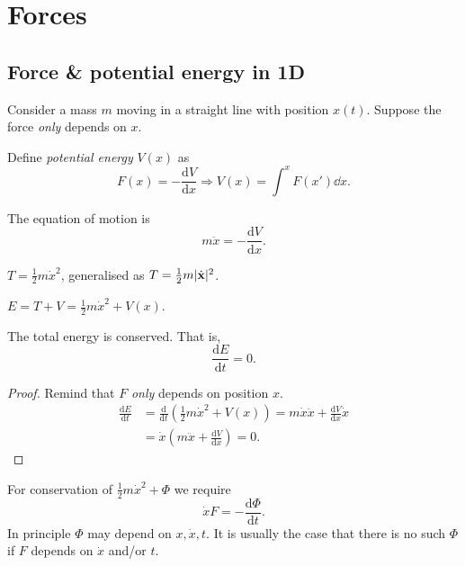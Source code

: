 \section{Forces}

\subsection{Force \& potential energy in 1D}

Consider a mass $m$ moving in a straight line with position $x(t)$. Suppose the force \textit{only} depends on $x$.
\begin{definition}
    Define \textit{potential energy} $ V(x) $ as 
    \[
        F(x) = -\frac{\mathrm{d}V}{\mathrm{d}x} \Longrightarrow V(x) = \int^{x}F(x')\dd x.
    \]
\end{definition}

The equation of motion is
\[
    m \ddot{x}=-\frac{\mathrm{d}V}{\mathrm{d}x} .
\]

\begin{definition}
    $T=\frac{1}{2}m \dot{x}^2$, generalised as $ T=\frac{1}{2}m|\dot{{\bf x}}|^2 $. 
\end{definition}
\begin{definition}
    $ E=T+V = \frac{1}{2}m \dot{x}^2+V(x) $.
\end{definition}
\begin{proposition}
    The total energy is conserved. That is, 
    \[
        \frac{\mathrm{d}E}{\mathrm{d}t}=0. 
    \]
\end{proposition}
\begin{proof}
    Remind that $F$ \textit{only} depends on position $x$.
    \begin{align*}
        \frac{\mathrm{d}E}{\mathrm{d}t} &= \frac{\mathrm{d}}{\mathrm{d}t}\left( \frac{1}{2} m \dot{x}^2+V(x) \right) = m \dot{x} \ddot{x} + \frac{\mathrm{d}V}{\mathrm{d}x} \dot{x}\\
        &= \dot{x} \left( m \ddot{x} + \frac{\mathrm{d}V}{\mathrm{d}x}  \right) = 0.
    \end{align*}
\end{proof}

\begin{note}
    For conservation of $ \frac{1}{2} m \dot{x}^2 + \Phi $ we require 
    \[
        \dot{x}F = -\frac{\mathrm{d}\Phi}{\mathrm{d}t}. 
    \]
    In principle $ \Phi $ may depend on $ x, \dot{x}, t $. It is usually the case that there is no such $ \Phi $ if $F$ depends on $ \dot{x} $ and/or $t$.
\end{note}

